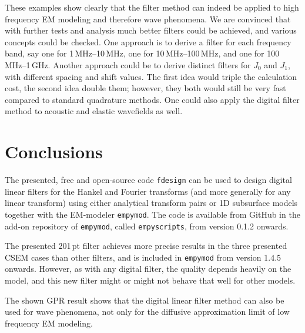 \documentclass[paper,twocolumn,twoside]{geophysics}
\begin{document}
%
%

These examples show clearly that the filter method can indeed be applied to
high frequency EM modeling and therefore wave phenomena. We are convinced that
with further tests and analysis much better filters could be achieved, and
various concepts could be checked. One approach is to derive a filter for each
frequency band, say one for 1\,MHz--10\,MHz, one for 10\,MHz--100\,MHz, and one
for 100\,MHz--1\,GHz. Another approach could be to derive distinct filters for
$J_0$ and $J_1$, with different spacing and shift values. The first idea would
triple the calculation cost, the second idea double them; however, they both
would still be very fast compared to standard quadrature methods. One could
also apply the digital filter method to acoustic and elastic wavefields as
well.

\section{Conclusions}

The presented, free and open-source code \texttt{fdesign} can be used to design
digital linear filters for the Hankel and Fourier transforms (and more
generally for any linear transform) using either analytical transform pairs or
1D subsurface models together with the EM-modeler \texttt{empymod}. The code is
available from GitHub in the add-on repository of \texttt{empymod}, called
\texttt{empyscripts}, from version 0.1.2 onwards.

The presented 201\,pt filter achieves more precise results in the three
presented CSEM cases than other filters, and is included in \texttt{empymod}
from version 1.4.5 onwards. However, as with any digital filter, the quality
depends heavily on the model, and this new filter might or might not behave
that well for other models.

The shown GPR result shows that the digital linear filter method can also be
used for wave phenomena, not only for the diffusive approximation limit of low
frequency EM modeling.
\end{document}
